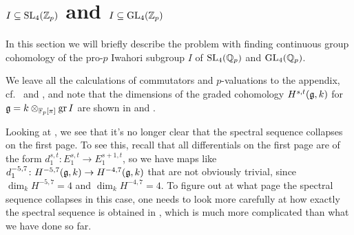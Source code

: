 \section[\texorpdfstring{$I \subseteq \SL_{4}(\Z_{p}),\GL_{4}(\Z_{p})$}{I in SL4(Zp) and GL4()}]{\texorpdfstring{$I \subseteq \operatorname{SL}_{4}(\mathbb{Z}_{p})$ and $I \subseteq \operatorname{GL}_{4}(\mathbb{Z}_{p})$}{I in SL4(Zp) and GL4(Zp)}}%
\label{sec:Iwa-SL4-GL4}

In this section we will briefly describe the problem with finding continuous group cohomology of the pro-$p$ Iwahori subgroup $I$ of $\operatorname{SL}_{4}(\mathbb{Q}_{p})$ and $\operatorname{GL}_{4}(\mathbb{Q}_{p})$.

We leave all the calculations of commutators and $p$-valuations to the appendix, cf.\  and , and note that the dimensions of the graded cohomology $H^{s,t}(\mathfrak{g},k)$ for $\mathfrak{g} = k \otimes_{\mathbb{F}_{p}[\pi]} \operatorname{gr} I$ are shown in  and .

Looking at , we see that it's no longer clear that the spectral sequence collapses on the first page. To see this, recall that all differentials on the first page are of the form $d_{1}^{s,t} \colon E_{1}^{s,t} \to E_{1}^{s+1,t}$, so we have maps like $d_{1}^{-5,7} \colon H^{-5,7}(\mathfrak{g},k) \to H^{-4,7}(\mathfrak{g},k)$ that are not obviously trivial, since $\dim_{k} H^{-5,7} = 4$ and $\dim_{k} H^{-4,7} = 4$. To figure out at what page the spectral sequence collapses in this case, one needs to look more carefully at how exactly the spectral sequence is obtained in \cite{Sor}, which is much more complicated than what we have done so far.

